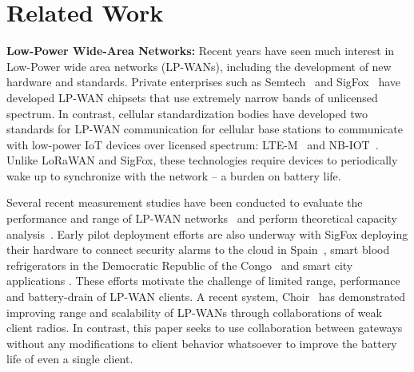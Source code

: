 \section{Related Work}
\label{sec:related-work}



\noindent \textbf{Low-Power Wide-Area Networks: } Recent years have seen much
interest in Low-Power wide area networks (LP-WANs), including the development
of new hardware and standards. Private enterprises such as
Semtech~\cite{LoRaWanAlliance2015} and SigFox~\cite{sanchez2016state} have
developed LP-WAN chipsets that use extremely narrow bands of unlicensed
spectrum. In contrast, cellular standardization bodies have developed two
standards for LP-WAN communication for cellular base stations to communicate
with low-power IoT devices over licensed spectrum:
LTE-M~\cite{GSMAssociation2016} and NB-IOT~\cite{ratasuk2016nb}. Unlike LoRaWAN
and SigFox, these technologies require devices to periodically wake up to
synchronize with the network -- a burden on battery life.

Several recent measurement studies have been conducted to evaluate the
performance and range of LP-WAN networks~\cite{petric2016measurements,
toldov2016performance} and perform theoretical capacity
analysis~\cite{mikhaylov2016analysis}. Early pilot deployment efforts are also
underway with SigFox deploying their hardware to connect security alarms to
the cloud in Spain~\cite{sanchez2016state}, smart blood refrigerators in the
Democratic Republic of the Congo~\cite{ramachandranmupnp} and smart city
applications \cite{centenaro2015long}. These efforts motivate the challenge of
limited range, performance and battery-drain of LP-WAN clients. A recent
system, Choir~\cite{eletreby2017empowering} has demonstrated improving range
and scalability of LP-WANs through collaborations of weak client radios. In
contrast, this paper seeks to use collaboration between gateways without any
modifications to client behavior whatsoever to improve the battery life of
even a single client.

